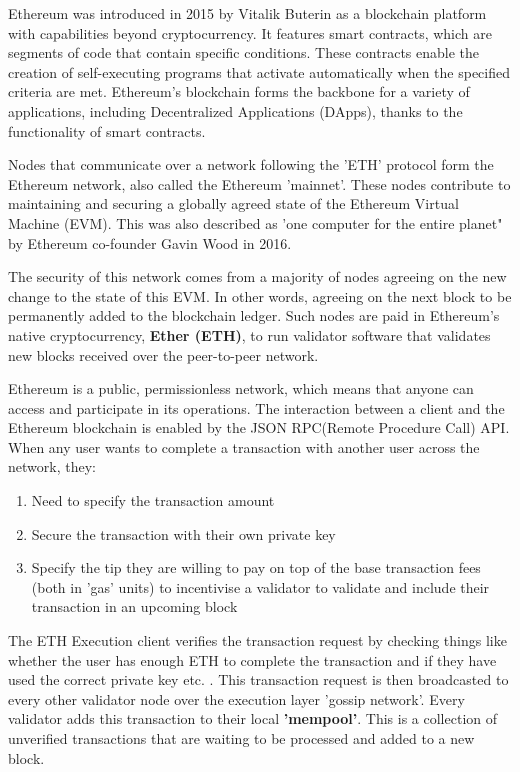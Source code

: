 Ethereum was introduced in 2015 by Vitalik Buterin as a blockchain platform with capabilities beyond cryptocurrency. It features smart contracts, which are segments of code that contain specific conditions. These contracts enable the creation of self-executing programs that activate automatically when the specified criteria are met. Ethereum's blockchain forms the backbone for a variety of applications, including Decentralized Applications (DApps), thanks to the functionality of smart contracts.

Nodes that communicate over a network following the 'ETH' protocol form the Ethereum network, also called the Ethereum 'mainnet'. These nodes contribute to maintaining and securing a globally agreed state of the Ethereum Virtual Machine (EVM). This was also described as 'one computer for the entire planet" by Ethereum co-founder Gavin Wood in 2016\cite{Ethereum:Industries}. 

The security of this network comes from a majority of nodes agreeing on the new change to the state of this EVM. In other words, agreeing on the next block to be permanently added to the blockchain ledger. Such nodes are paid in Ethereum's native cryptocurrency, \textbf{Ether (ETH)}, to run validator software that validates new blocks received over the peer-to-peer network.

Ethereum is a public, permissionless network, which means that anyone can access and participate in its operations. The interaction between a client and the Ethereum blockchain is enabled by the JSON RPC(Remote Procedure Call) API. When any user wants to complete a transaction with another user across the network, they:
\begin{enumerate}
    \item Need to specify the transaction amount
    \item Secure the transaction with their own private key
    \item Specify the tip they are willing to pay on top of the base transaction fees (both in 'gas' units) to incentivise a validator to validate and include their transaction in an upcoming block
\end{enumerate}

The ETH Execution client verifies the transaction request by checking things like whether the user has enough ETH to complete the transaction and if they have used the correct private key etc. \cite{EthereumEthereum.org}. 
This transaction request is then broadcasted to every other validator node over the execution layer 'gossip network'. Every validator adds this transaction to their local \textbf{'mempool'}. This is a collection of unverified transactions that are waiting to be processed and added to a new block.

